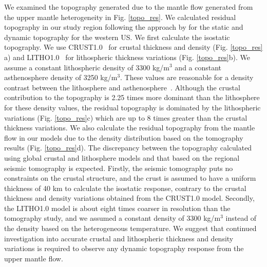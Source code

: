 \documentclass[draft,linenumbers]{agujournal2018}
\begin{document}
    We examined the topography generated due to the mantle flow generated from the upper mantle heterogeneity in Fig. \ref{topo_res}. We calculated residual topography in our study region following the approach by \citet{becker2014static} for the static and dynamic topography for the western US. We first calculate the isostatic topography. We use CRUST1.0~\citep{laske2013update} for crustal thickness and density (Fig. \ref{topo_res} a) and LITHO1.0~\citep{pasyanos2014litho1} for lithospheric thickness variations (Fig. \ref{topo_res}b). We assume a constant lithospheric density of 3300 kg/m$^3$ and a constant asthenosphere density of 3250 kg/m$^3$. These values are reasonable for a density contrast between the lithosphere and asthenosphere~\citep[e.g.,][]{bonnardot2008numerical, ito2011probing}. Although the crustal contribution to the topography is 2.25 times more dominant than the lithosphere for these density values, the residual topography is dominated by the lithospheric variations (Fig. \ref{topo_res}c) which are up to 8 times greater than the crustal thickness variations. We also calculate the residual topography from the mantle flow in our models due to the density distribution based on the \citet{Biryol_2016} tomography results (Fig. \ref{topo_res}d). The discrepancy between the topography calculated using global crustal and lithosphere models and that based on the regional seismic tomography is expected. Firstly, the seismic tomography puts no constraints on the crustal structure, and the crust is assumed to have a uniform thickness of 40 km to calculate the isostatic response, contrary to the crustal thickness and density variations obtained from the CRUST1.0 model. Secondly, the LITHO1.0 model is about eight times coarser in resolution than the tomography study, and we assumed a constant density of 3300 kg/m$^3$ instead of the density based on the heterogeneous temperature. We suggest that continued investigation into accurate crustal and lithospheric thickness and density variations is required to observe any dynamic topography response from the upper mantle flow.
%
    
\end{document}
